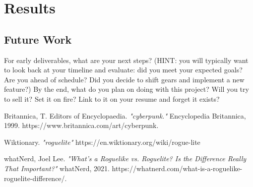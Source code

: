 \documentclass[10pt,conference,onecolumn,compsoc]{IEEEtran}
\begin{document}
\section{Results}

\subsection{Future Work}
For early deliverables, what are your next steps?  (HINT: you will typically want to look back at your timeline and evaluate: did you meet your expected goals?  Are you ahead of schedule?  Did you decide to shift gears and implement a new feature?)
By the end, what do you plan on doing with this project?  Will you try to sell it?  Set it on fire?  Link to it on your resume and forget it exists?





\begin{thebibliography}{1}

Britannica, T. Editors of Encyclopaedia. \emph{"cyberpunk."} Encyclopedia Britannica, 1999. https://www.britannica.com/art/cyberpunk.

Wiktionary. \emph{"roguelite"}
https://en.wiktionary.org/wiki/rogue-lite

whatNerd, Joel Lee. \emph{"What’s a Roguelike vs. Roguelite? Is the Difference Really That Important?"} whatNerd, 2021. https://whatnerd.com/what-is-a-roguelike-roguelite-difference/.

\end{thebibliography}

\end{document}
